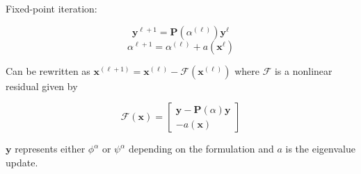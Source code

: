 \documentclass{article}
\begin{document}
Fixed-point iteration:

\begin{equation*}
\mathbf{y}^{\ell + 1} = \mathbf{P}(\alpha^{(\ell)})\mathbf{y}^{\ell}
\end{equation*}
\begin{equation*}
\alpha^{\ell + 1} = \alpha^{(\ell)} + a(\mathbf{x}^{\ell})
\end{equation*}

Can be rewritten as $\mathbf{x}^{(\ell + 1)} = \mathbf{x}^{(\ell)} - \mathcal{F}(\mathbf{x}^{(\ell)})$ where $\mathcal{F}$ is a nonlinear residual given by 

\begin{equation*}
\mathcal{F}(\mathbf{x}) = \begin{bmatrix} \mathbf{y} - \mathbf{P}(\alpha)\mathbf{y} \\ -a(\mathbf{x}) \end{bmatrix}
\end{equation*}

$\mathbf{y}$ represents either $\phi^{\alpha}$ or $\psi^{\alpha}$ depending on the formulation and $a$ is the eigenvalue update.
\end{document}
